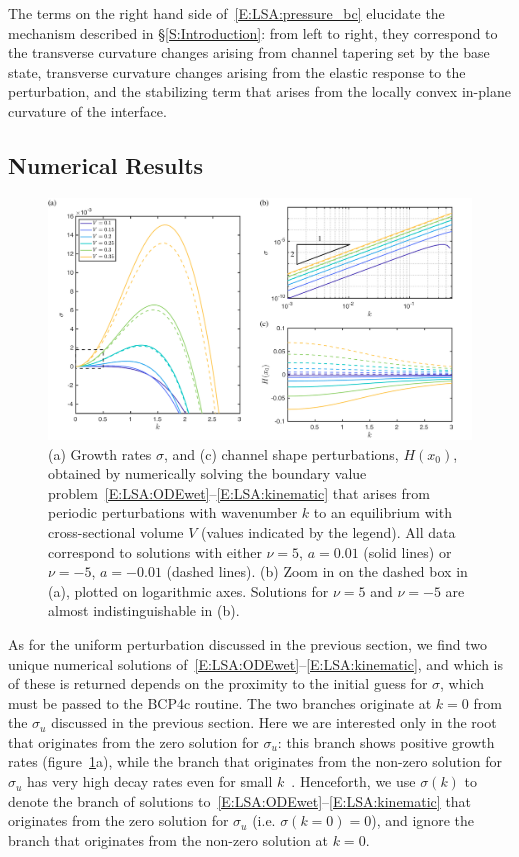 \documentclass{jfm}
\begin{document}
The terms on the right hand side of~\eqref{E:LSA:pressure_bc} elucidate the mechanism described in \S\ref{S:Introduction}: from left to right, they correspond to the transverse curvature changes arising from channel tapering set by the base state, transverse curvature changes arising from the elastic response to the perturbation, and the stabilizing term that arises from the locally convex in-plane curvature of the interface.


\subsection{Numerical Results}

\begin{figure}
\centering
\includegraphics[width =\textwidth]{figures/fig6_growth_rates.pdf}
\caption{(a) Growth rates $\sigma$, and (c) channel shape perturbations, $H(x_0)$, obtained by numerically solving the boundary value problem~\eqref{E:LSA:ODEwet}--\eqref{E:LSA:kinematic} that arises from periodic perturbations with wavenumber $k$ to an equilibrium with cross-sectional volume $V$ (values indicated by the legend). All data correspond to solutions with either $\nu = 5$, $a = 0.01$ (solid lines) or $\nu = -5$, $a = -0.01$ (dashed lines). (b) Zoom in on the dashed box in (a), plotted on logarithmic axes. Solutions for $\nu = 5$ and $\nu = -5$ are almost indistinguishable in (b).}
\label{fig:LinearStability:GrowthRates}
\end{figure}


As for the uniform perturbation discussed in the previous section, we find two unique numerical solutions of~\eqref{E:LSA:ODEwet}--\eqref{E:LSA:kinematic}, and which is of these is returned depends on the proximity to the initial guess for $\sigma$, which must be passed to the BCP4c routine. The two branches originate at $k=0$ from the $\sigma_u$ discussed in the previous section. Here we are interested only in the root that originates from the zero solution for $\sigma_u$: this branch shows positive growth rates (figure~\ref{fig:LinearStability:GrowthRates}a), while the branch that originates from the non-zero solution for $\sigma_u$ has very high decay rates even for small $k$~\citep[not shown, see Ch. 5 in][]{BradleyPhDthesis}. Henceforth, we use $\sigma(k)$ to denote the branch of solutions to~\eqref{E:LSA:ODEwet}--\eqref{E:LSA:kinematic} that originates from the zero solution for $\sigma_u$ (i.e. $\sigma(k=0) = 0$), and ignore the branch that originates from the non-zero solution at $k = 0$.
\end{document}

